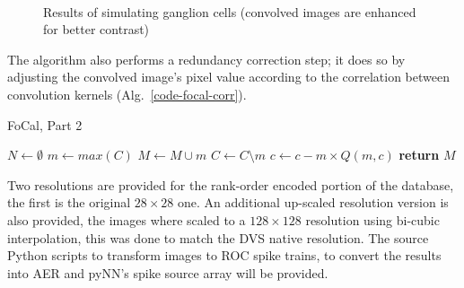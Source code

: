 \begin{figure}[hbt]
  \centering
  \\
  \caption{Results of simulating ganglion cells (convolved images are enhanced for better contrast)}
  \label{fig-convolution-results}
\end{figure}
The algorithm also performs a redundancy correction step; it does so by 
adjusting the convolved image's pixel value according to the correlation 
between convolution kernels (Alg.~\ref{code-focal-corr}).
\begin{algorithm}[h]
  \caption{FoCal, Part 2}
  \label{code-focal-corr}
  \begin{algorithmic}
    \State $N \leftarrow \emptyset$ 
    \Repeat
    \State $m \leftarrow max(C)$
    \State $M \leftarrow M \cup m$
    \State $C \leftarrow C \setminus m$
     
     
    \State $c \leftarrow c - m \times Q(m, c)$
    \EndIf
    \EndFor
    \State \textbf{return} $M$
    \EndProcedure
  \end{algorithmic}
\end{algorithm}
Two resolutions are provided for the rank-order encoded portion of the database, the first is the original $28\times28$ one. An additional up-scaled resolution version is also provided, the images where scaled to a $128\times128$ resolution using bi-cubic interpolation, this was done to match the DVS native resolution. The source Python scripts to transform images to ROC spike trains, to convert the results into AER and pyNN's spike source array will be provided.